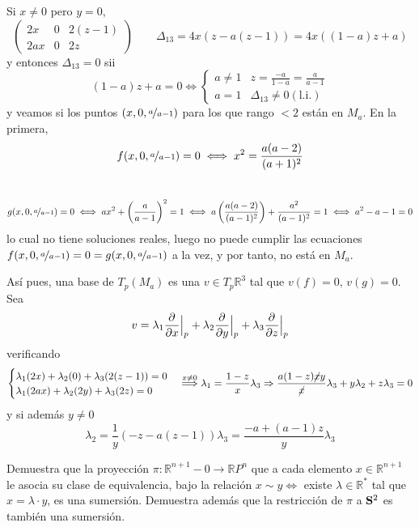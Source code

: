 \begin{sol}
    Si $x \neq 0$ pero $y=0$, 
     $$\begin{pmatrix}
        2x & 0 & 2(z-1) \\ 2ax & 0 & 2z
    \end{pmatrix}\qquad \Delta_{13} = 4x(z-a(z-1))=4x((1-a)z+a)$$
    y entonces $\Delta_{13}=0$ sii
    $$(1-a)z+a=0 \iff \begin{cases}
        a\neq 1 & z=\frac{-a}{1-a} = \frac{a}{a-1}\\ a=1 & \Delta_{13} \neq 0 (\text{l.i.})
    \end{cases}$$
    y veamos si los puntos $(x,0,\nicefrac{a}{a-1})$ para los que rango $<2$ est\'an en $M_a$. En la primera, 
    $$f(x,0,\nicefrac{a}{a-1}) = 0 \iff x^2=\dfrac{a(a-2)}{(a+1)^2}$$\
    $$g(x,0,\nicefrac{a}{a-1}) = 0 \iff ax^2+\left( \dfrac{a}{a-1}\right)^2 = 1 \iff a\left( \dfrac{a(a-2)}{(a-1)^2}\right) + \dfrac{a^2}{(a-1)^2} = 1 \iff a^2-a-1=0$$
    lo cual no tiene soluciones reales, luego no puede cumplir las ecuaciones $f(x,0,\nicefrac{a}{a-1})=0=g(x,0,\nicefrac{a}{a-1})$ a la vez, y por tanto, no est\'a en $M_a$.

    As\'i pues, una base de $T_p(M_a)$ es una $v \in T_p\mathbb R^3$ tal que $v(f)=0, \, v(g)=0$. Sea $$v=\lambda_1 \dfrac{\partial^{} }{\partial x} \Big|_p +\lambda_2 \dfrac{\partial^{} }{\partial y} \Big|_p + \lambda_3 \dfrac{\partial^{} }{\partial z} \Big|_p$$
    verificando
    $$\begin{cases}
        \lambda_1(2x)+\lambda_2(0)+\lambda_3(2(z-1)) = 0\\ \lambda_1(2ax)+\lambda_2(2y)+\lambda_3(2z)=0
    \end{cases} \overset{x\neq 0}{\Longrightarrow} \lambda_1 = \dfrac{1-z}{x} \lambda_3 \Rightarrow \dfrac{a(1-z)\cancel{x}y}{\cancel{x}} \lambda_3  + y \lambda_2 + z\lambda_3 = 0$$
    y si adem\'as $y \neq 0$
    $$\lambda_2 = \dfrac{1}{y}(-z-a(z-1))\lambda_3 = \dfrac{-a+(a-1)z}{y} \lambda_3$$
\end{sol}
\begin{ejer}
    [3.33] Demuestra que la proyecci\'on $\pi : \mathbb R^{n+1} - {0} \longrightarrow \mathbb RP^n$ que a cada elemento $x \in \mathbb R^{n+1}$ le asocia su clase de equivalencia, bajo la relaci\'on $x \sim y \iff$ existe $λ \in \mathbb R^*$ tal que $x = \lambda \cdot y$, es una sumersi\'on. Demuestra adem\'as que la restricci\'on de $\pi$ a $\bold S^2$ es tambi\'en una sumersi\'on.
\end{ejer}

